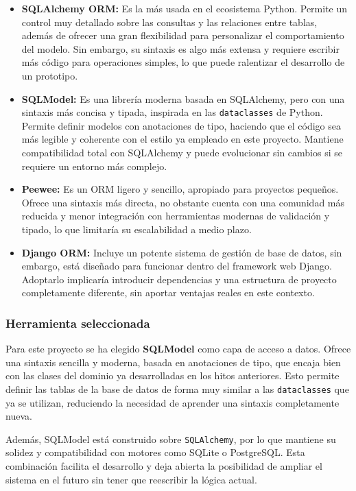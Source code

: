 \begin{itemize}
    \item \textbf{SQLAlchemy ORM:} Es la más usada en el ecosistema Python. Permite un control muy 
    detallado sobre las consultas y las relaciones entre tablas, además de ofrecer una gran flexibilidad para 
    personalizar el comportamiento del modelo. Sin embargo, su sintaxis es algo más extensa y requiere escribir 
    más código para operaciones simples, lo que puede ralentizar el desarrollo de un prototipo.

    \item \textbf{SQLModel:} Es una librería moderna basada en SQLAlchemy, pero con una sintaxis más concisa y 
    tipada, inspirada en las \texttt{dataclasses} de Python. Permite definir modelos con anotaciones de tipo, 
    haciendo que el código sea más legible y coherente con el estilo ya empleado en este proyecto. Mantiene 
    compatibilidad total con SQLAlchemy y puede evolucionar sin cambios si se requiere un entorno más complejo.

    \item \textbf{Peewee:} Es un ORM ligero y sencillo, apropiado para proyectos pequeños. Ofrece una sintaxis 
    más directa, no obstante cuenta con una comunidad más reducida y menor integración con herramientas modernas de 
    validación y tipado, lo que limitaría su escalabilidad a medio plazo.

    \item \textbf{Django ORM:} Incluye un potente sistema de gestión de base de datos, sin embargo, está diseñado para 
    funcionar dentro del framework web Django. Adoptarlo implicaría introducir dependencias y una estructura 
    de proyecto completamente diferente, sin aportar ventajas reales en este contexto.
\end{itemize}

\subsubsection{Herramienta seleccionada}
Para este proyecto se ha elegido \textbf{SQLModel} como capa de acceso a datos.  
Ofrece una sintaxis sencilla y moderna, basada en anotaciones de tipo, que encaja bien con las clases del dominio 
ya desarrolladas en los hitos anteriores. Esto permite definir las tablas de la base de datos de forma muy similar 
a las \texttt{dataclasses} que ya se utilizan, reduciendo la necesidad de aprender una sintaxis completamente nueva.

Además, SQLModel está construido sobre \texttt{SQLAlchemy}, por lo que mantiene su solidez y compatibilidad con 
motores como SQLite o PostgreSQL. Esta combinación facilita el desarrollo y deja abierta la posibilidad de ampliar 
el sistema en el futuro sin tener que reescribir la lógica actual.

